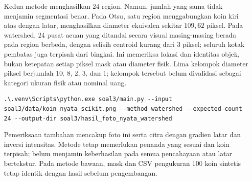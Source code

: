 Kedua metode menghasilkan 24 region. Namun, jumlah yang sama tidak
menjamin segmentasi benar. Pada Otsu, satu region menggabungkan koin kiri
atas dengan latar, menghasilkan diameter ekuivalen sekitar $109{,}62$ piksel.
Pada watershed, 24 pusat acuan yang ditandai secara visual masing-masing
berada pada region berbeda, dengan selisih centroid kurang dari 3 piksel;
seluruh kotak pembatas juga terpisah dari bingkai. Ini memeriksa lokasi
dan identitas objek, bukan ketepatan setiap piksel mask atau diameter fisik.
Lima kelompok diameter piksel berjumlah 10, 8, 2, 3, dan 1; kelompok
tersebut belum divalidasi sebagai kategori ukuran fisik atau nominal uang.

\begin{lstlisting}[style=terminal]
.\.venv\Scripts\python.exe soal3/main.py --input soal3/data/koin_nyata_scikit.png --method watershed --expected-count 24 --output-dir soal3/hasil_foto_nyata_watershed
\end{lstlisting}

Pemeriksaan tambahan mencakup foto ini serta citra dengan gradien latar
dan inversi intensitas. Metode tetap memerlukan penanda yang sesuai dan
koin terpisah; belum menjamin keberhasilan pada semua pencahayaan atau
latar bertekstur. Pada metode bawaan, mask dan CSV pengukuran 100 koin
sintetis tetap identik dengan hasil sebelum pengembangan.
